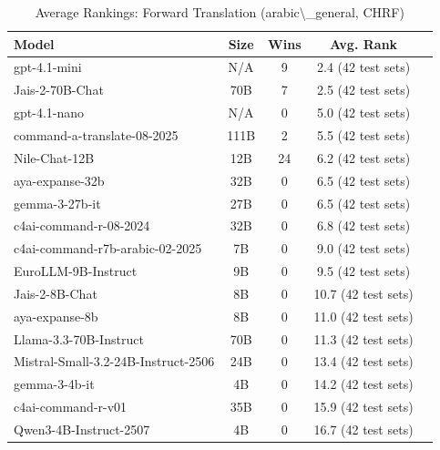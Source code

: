 \begin{table}[htbp]
\centering
\caption{Average Rankings: Forward Translation (arabic\textbackslash{}_general, CHRF)}
\label{tab:avg_rankings_chrf_arabic_general}
\begin{tabular}{l@{\hspace{3pt}}c@{\hspace{3pt}}c@{\hspace{3pt}}c@{\hspace{3pt}}c}
\toprule
Model & Size & Wins & Avg. Rank \\
\midrule
gpt-4.1-mini & N/A & 9 & 2.4 (42 test sets) \\
Jais-2-70B-Chat & 70B & 7 & 2.5 (42 test sets) \\
gpt-4.1-nano & N/A & 0 & 5.0 (42 test sets) \\
command-a-translate-08-2025 & 111B & 2 & 5.5 (42 test sets) \\
Nile-Chat-12B & 12B & 24 & 6.2 (42 test sets) \\
aya-expanse-32b & 32B & 0 & 6.5 (42 test sets) \\
gemma-3-27b-it & 27B & 0 & 6.5 (42 test sets) \\
c4ai-command-r-08-2024 & 32B & 0 & 6.8 (42 test sets) \\
c4ai-command-r7b-arabic-02-2025 & 7B & 0 & 9.0 (42 test sets) \\
EuroLLM-9B-Instruct & 9B & 0 & 9.5 (42 test sets) \\
Jais-2-8B-Chat & 8B & 0 & 10.7 (42 test sets) \\
aya-expanse-8b & 8B & 0 & 11.0 (42 test sets) \\
Llama-3.3-70B-Instruct & 70B & 0 & 11.3 (42 test sets) \\
Mistral-Small-3.2-24B-Instruct-2506 & 24B & 0 & 13.4 (42 test sets) \\
gemma-3-4b-it & 4B & 0 & 14.2 (42 test sets) \\
c4ai-command-r-v01 & 35B & 0 & 15.9 (42 test sets) \\
Qwen3-4B-Instruct-2507 & 4B & 0 & 16.7 (42 test sets) \\
\bottomrule
\end{tabular}
\end{table}